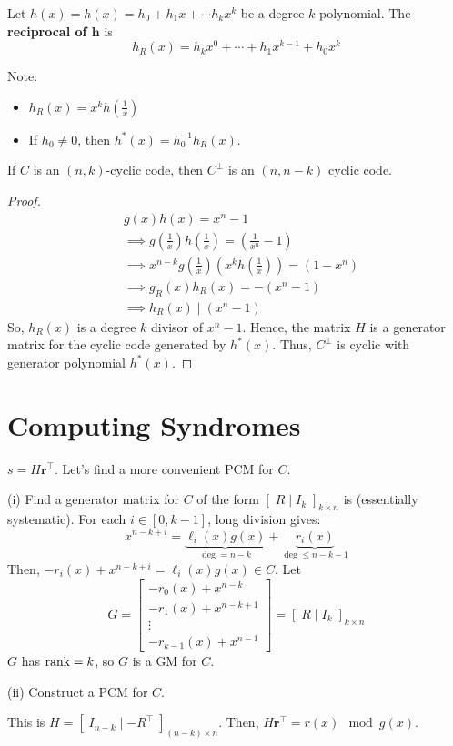\begin{defbox}
    \begin{definition}
        Let $ h(x)=h(x)=h_{0}+h_{1} x+\cdots h_k x^{k} $ be a degree $ k $
        polynomial. The \textbf{reciprocal of $\bm{h}$} is
        \[ h_{R}(x)=h_kx^{0}+\cdots+h_{1}x^{k-1}+h_{0}x^{k} \]
    \end{definition}
\end{defbox}
Note:
\begin{itemize}
    \item $ h_R(x)=x^k h\left( \frac{1}{x} \right) $
    \item If $ h_0\neq 0 $, then $ h^*(x)=h_{0}^{-1}h_R(x) $.
\end{itemize}

\begin{thmbox}
    \begin{theorem}
        If $ C $ is an $ (n,k) $-cyclic code, then $ C^{\perp} $ is an
        $ (n,n-k) $ cyclic code.
    \end{theorem}
\end{thmbox}

\begin{proof}
    \begin{align*}
        &g(x)h(x)=x^n-1\\
        &\implies g\left( \frac{1}{x} \right)h\left( \frac{1}{x}  \right)= \left( \frac{1}{x^n}-1 \right)\\
        &\implies x^{n-k}g\left( \frac{1}{x}  \right)\left( x^k h\left( \frac{1}{x} \right) \right)=
        (1-x^n)\\
        &\implies g_R(x)h_R(x)=-(x^n-1)\\
        &\implies h_R(x)\mid (x^n-1)
    \end{align*}
    So, $ h_R(x) $ is a degree $ k $ divisor of $ x^n-1 $. Hence, the matrix
    $ H $ is a generator matrix for the cyclic code generated by $ h^*(x) $.
    Thus, $ C^{\perp} $ is cyclic with generator polynomial $ h^*(x) $.
\end{proof}

\section{Computing Syndromes}
$ s=H\bm{r}^\top $. Let's find a more convenient PCM for $ C $.

(i) Find a generator matrix for $ C $ of the form
$\left[ \; R\mid I_k\; \right]_{k\times n}$ is (essentially systematic).
For each $ i\in [0,k-1] $, long division gives:
\[ x^{n-k+i}=
\underbrace{\ell_i(x)g(x)}_{\deg=n-k}+\underbrace{r_i(x)}_{\deg\leqslant n-k-1} \]
Then, $ -r_i(x)+x^{n-k+i}=\ell_i(x)g(x)\in C $.
Let
\[ G=
\begin{bmatrix}
    -r_0(x)+x^{n-k}\\
    -r_1(x)+x^{n-k+1}\\
    \vdots\\
    -r_{k-1}(x)+x^{n-1}
\end{bmatrix}=\left[ \; R\mid I_k\; \right]_{k\times n}\]
$ G $ has $ \operatorname{rank}=k $, so $ G $ is a GM for $ C $.

(ii) Construct a PCM for $ C $.

This is $ H=\left[ \; I_{n-k}\mid -R^{\top}\; \right]_{(n-k)\times n} $.
Then, $ H\bm{r}^\top=r(x)\mod g(x) $.
